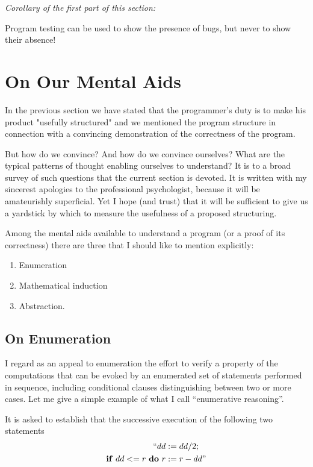 \noindent
\textit{Corollary of the first part of this section:}

Program testing can be used to show the presence of bugs, but never to
show their absence!

\section{On Our Mental Aids}

In the previous section we have stated that the programmer's duty is to make his product "usefully structured" and we mentioned the program structure in connection with a convincing demonstration of the correctness of the program.

But how do we convince? And how do we convince ourselves? What are the typical patterns of thought enabling ourselves to understand? It is to a broad survey of such questions that the current section is devoted. It is written with my sincerest apologies to the professional psychologist, because it will be amateurishly superficial. Yet I hope (and trust) that it will be sufficient to give us a yardstick by which to measure the usefulness of a proposed structuring.

Among the mental aids available to understand a program (or a proof of its correctness) there are three that I should like to mention explicitly:

\begin{enumerate}[label=(\arabic*)]
\item Enumeration
\item Mathematical induction
\item Abstraction.
\end{enumerate}

\subsection{On Enumeration}

I regard as an appeal to enumeration the effort to verify a property of the computations that can be evoked by an enumerated set of statements performed in sequence, including conditional clauses distinguishing between two or more cases. Let me give a simple example of what I call ``enumerative reasoning''.

It is asked to establish that the successive execution of the following two statements
\begin{equation*}
	\begin{split}
		\text{``}dd &:= dd/2; \\
		\text{\textbf{if} } dd <= r \text{ \textbf{do} } r &:= r - dd\text{''}
	\end{split}
\end{equation*}

